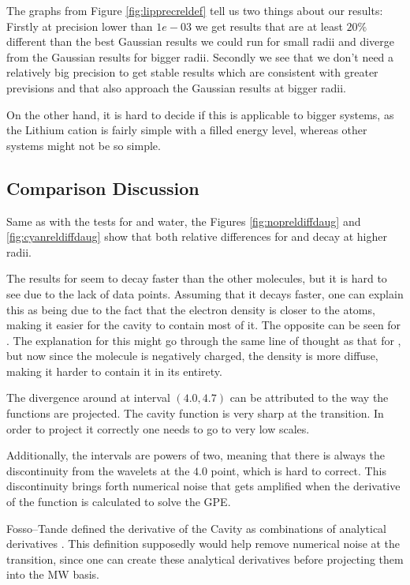 \documentclass[../master_thesis.tex]{subfiles}
\begin{document}
The graphs from Figure \ref{fig:lipprecreldef} tell us two things about our results:
Firstly at precision lower than $1e-03$ we get results that are at least $20\%$ different
than the best Gaussian results we could run for small radii and diverge from the
Gaussian results for bigger radii. Secondly we see that we don't need a relatively big
precision to get stable results which are consistent with greater previsions and
that also approach the Gaussian results at bigger radii.

On the other hand, it is hard to decide if this is applicable to bigger systems,
as the Lithium cation is fairly simple with a filled energy level, whereas
other systems might not be so simple.

\subsection{Comparison Discussion}
Same as with the tests for  and water, the Figures \ref{fig:nopreldiffdaug}
and  \ref{fig:cyanreldiffdaug} show that both relative differences for 
and  decay at higher radii.

The results for   seem to decay faster than the other molecules, but it
is hard to see due to the lack of data points. Assuming that it decays faster,
one can explain this as being due to the fact that the electron density is
closer to the atoms, making it easier for the cavity to contain most of it.
The opposite can be seen for . The explanation for this might go through
the same line of thought as that for , but now since the molecule is negatively
charged, the density is more diffuse, making it harder to contain it in its entirety.

The divergence around at interval $(4.0, 4.7)$ can be attributed to the way the
functions are projected. The cavity function is very sharp at the transition. In order to
project it correctly one needs to go to very low scales.

Additionally, the intervals are
powers of two, meaning that there is always the discontinuity from the wavelets at the
$4.0$ point, which is hard to correct. This discontinuity brings forth numerical
noise that gets amplified when the derivative of the function is calculated to solve the
\ac{GPE}.

Fosso--Tande defined the derivative of the Cavity as combinations of analytical
derivatives \cite{FossoTande:2013ka}. This definition supposedly would help
remove numerical noise at the transition, since one can create these analytical
derivatives before projecting them into the \ac{MW} basis.
\end{document}

